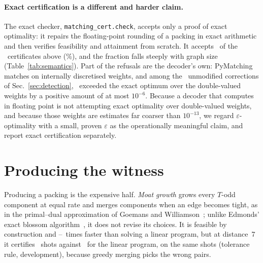 \documentclass[aps,pra,twocolumn,superscriptaddress,nofootinbib,longbibliography,floatfix]{revtex4-2}
\newcommand{\eps}{\varepsilon}
\newcommand{\T}{T}
\begin{document}
\begin{table}[tbp]
\caption{Exact re-analysis of the certificates accepted by the code that produced each reported artifact, named by its commit in the project's development repository; the source of these four commits ships as release tarballs (Sec.~\ref{sec:repro}). ``Largest proven slack'' is $\max\eps(J,z)$ from the lemma, computed in rational arithmetic. The last two columns show how the exact checker, which demands exact optimality, treats the same certificates, and how many of the same shots the current producer certifies under that stricter rule, using its base ladder and escalation tier but not its exact separation tier.}
\label{tab:semantics}

\end{table}

\paragraph*{Exact certification is a different and harder claim.} The exact checker, \texttt{matching\_cert.check}, accepts only a proof of exact optimality: it repairs the floating-point rounding of a packing in exact arithmetic and then verifies feasibility and attainment from scratch. It accepts \AuditExactSame\ of the \AuditAccepted\ certificates above (\AuditExactSamePct\%), and the fraction falls steeply with graph size (Table~\ref{tab:semantics}). Part of the refusals are the decoder's own: PyMatching matches on internally discretised weights, and among the \DetCleanN\ unmodified corrections of Sec.~\ref{sec:detection}, \DetCleanPymExcessPositive\ exceeded the exact optimum over the double-valued weights by a positive amount of at most $10^{-6}$. Because a decoder that computes in floating point is not attempting exact optimality over double-valued weights, and because those weights are estimates far coarser than $10^{-13}$, we regard $\eps$-optimality with a small, proven $\eps$ as the operationally meaningful claim, and report exact certification separately.

\section{Producing the witness}
\label{sec:producer}

Producing a packing is the expensive half. \emph{Moat growth} grows every $\T$-odd component at equal rate and merges components when an edge becomes tight, as in the primal--dual approximation of Goemans and Williamson~\cite{goemans1995general}; unlike Edmonds' exact blossom algorithm~\cite{edmonds1965paths}, it does not revise its choices. It is feasible by construction and \GrowthSpeedupLo--\GrowthSpeedupHi\ times faster than solving a linear program, but at distance~7 it certifies \GrowthDSevenCertified\ shots against \LpDSevenCertified\ for the linear program, on the same shots (tolerance rule, development), because greedy merging picks the wrong pairs.
\end{document}
